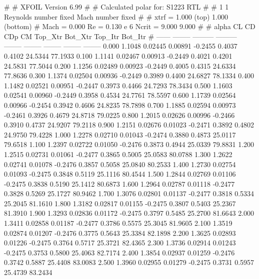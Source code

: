 #  
#       XFOIL         Version 6.99
#  
# Calculated polar for: S1223 RTL                                       
#  
# 1 1 Reynolds number fixed          Mach number fixed         
#  
# xtrf =   1.000 (top)        1.000 (bottom)  
# Mach =   0.000     Re =     0.130 e 6     Ncrit =   9.000  9.000
#  
#   alpha    CL        CD       CDp       CM     Top_Xtr  Bot_Xtr  Top_Itr  Bot_Itr
#  ------ -------- --------- --------- -------- -------- -------- -------- --------
   0.000   1.1048   0.02445   0.00891  -0.2455   0.4037   0.4102  24.5344  77.1933
   0.100   1.1141   0.02467   0.00913  -0.2449   0.4021   0.4201  24.5831  77.5044
   0.200   1.1256   0.02489   0.00923  -0.2449   0.4005   0.4315  24.6334  77.8636
   0.300   1.1374   0.02504   0.00936  -0.2449   0.3989   0.4400  24.6827  78.1334
   0.400   1.1482   0.02521   0.00951  -0.2447   0.3973   0.4466  24.7293  78.3434
   0.500   1.1603   0.02541   0.00960  -0.2449   0.3958   0.4534  24.7761  78.5597
   0.600   1.1739   0.02564   0.00966  -0.2454   0.3942   0.4606  24.8235  78.7898
   0.700   1.1885   0.02594   0.00973  -0.2461   0.3926   0.4679  24.8718  79.0225
   0.800   1.2015   0.02626   0.00996  -0.2466   0.3910   0.4737  24.9207  79.2118
   0.900   1.2151   0.02676   0.01023  -0.2471   0.3892   0.4802  24.9750  79.4228
   1.000   1.2278   0.02710   0.01043  -0.2474   0.3880   0.4873  25.0117  79.6518
   1.100   1.2397   0.02722   0.01050  -0.2476   0.3873   0.4944  25.0339  79.8831
   1.200   1.2515   0.02731   0.01061  -0.2477   0.3865   0.5005  25.0583  80.0788
   1.300   1.2622   0.02741   0.01078  -0.2476   0.3857   0.5058  25.0840  80.2533
   1.400   1.2730   0.02754   0.01093  -0.2475   0.3848   0.5119  25.1116  80.4544
   1.500   1.2844   0.02769   0.01106  -0.2475   0.3838   0.5190  25.1412  80.6873
   1.600   1.2964   0.02787   0.01118  -0.2477   0.3828   0.5269  25.1727  80.9462
   1.700   1.3076   0.02801   0.01137  -0.2477   0.3818   0.5334  25.2045  81.1610
   1.800   1.3182   0.02817   0.01155  -0.2475   0.3807   0.5403  25.2367  81.3910
   1.900   1.3293   0.02836   0.01172  -0.2475   0.3797   0.5485  25.2700  81.6643
   2.000   1.3411   0.02858   0.01187  -0.2477   0.3786   0.5575  25.3045  81.9605
   2.100   1.3519   0.02874   0.01207  -0.2476   0.3775   0.5643  25.3384  82.1898
   2.200   1.3625   0.02893   0.01226  -0.2475   0.3764   0.5717  25.3721  82.4365
   2.300   1.3736   0.02914   0.01243  -0.2475   0.3753   0.5800  25.4063  82.7174
   2.400   1.3854   0.02937   0.01259  -0.2476   0.3742   0.5887  25.4408  83.0083
   2.500   1.3960   0.02955   0.01279  -0.2475   0.3731   0.5957  25.4739  83.2434
